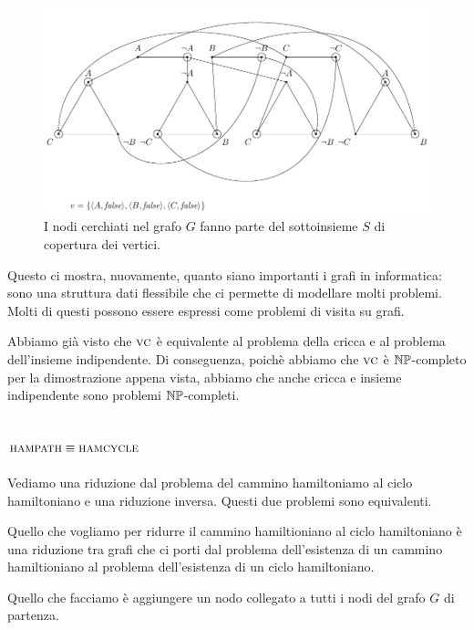 \begin{figure}[h]
    \begin{center}
        \includegraphics[scale=0.75]{./img/NPClass/SATtoVC3.pdf}
        \caption{I nodi cerchiati nel grafo $G$ fanno parte del sottoinsieme $S$ di copertura dei
        vertici.}
    \end{center}
\end{figure}

Questo ci mostra, nuovamente, quanto siano importanti i grafi in informatica: sono una struttura
dati flessibile che ci permette di modellare molti problemi. Molti di questi possono essere espressi
come problemi di visita su grafi.

Abbiamo già visto che $\textsc{vc}$ è equivalente al problema della cricca e al problema dell'insieme
indipendente. Di conseguenza, poichè abbiamo che $\textsc{vc}$ è $\mathbb{NP}$-completo per la dimostrazione
appena vista, abbiamo che anche cricca e insieme indipendente sono problemi $\mathbb{NP}$-completi.

\subsection{$\textsc{hampath} \equiv \textsc{hamcycle}$}

Vediamo una riduzione dal problema del cammino hamiltoniamo al ciclo hamiltoniano e una riduzione
inversa. Questi due problemi sono equivalenti.

Quello che vogliamo per ridurre il cammino hamiltioniano al ciclo hamiltoniano è una riduzione tra
grafi che ci porti dal problema dell'esistenza di un cammino hamiltioniano al problema
dell'esistenza di un ciclo hamiltoniano.

Quello che facciamo è aggiungere un nodo collegato a tutti i nodi del grafo $G$ di partenza.

